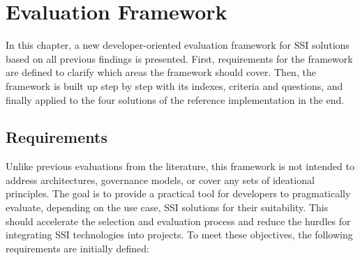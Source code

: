 \chapter{Evaluation Framework}\label{chapter: framework}
    
    In this chapter, a new developer-oriented evaluation framework for \ac{SSI} solutions based on all previous findings is presented. First, requirements for the framework are defined to clarify which areas the framework should cover. Then, the framework is built up step by step with its indexes, criteria and questions, and finally applied to the four solutions of the reference implementation in the end. 
    
	\section{Requirements}
	
	Unlike previous evaluations from the literature, this framework is not intended to address architectures, governance models, or cover any sets of ideational principles. The goal is to provide a practical tool for developers to pragmatically evaluate, depending on the use case, \ac{SSI} solutions for their suitability. This should accelerate the selection and evaluation process and reduce the hurdles for integrating \ac{SSI} technologies into projects. To meet these objectives, the following requirements are initially defined:
	
